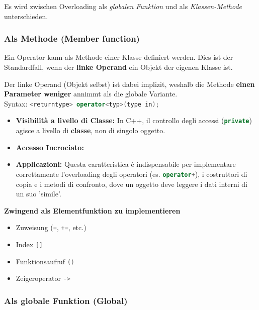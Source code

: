 Es wird zwischen Overloading als \textit{globalen Funktion} und als \textit{Klassen-Methode} unterschieden.

\subsubsection{Als Methode (Member function)}

Ein Operator kann als Methode einer Klasse definiert werden. Dies ist der Standardfall, wenn der \textbf{linke Operand} ein Objekt der eigenen Klasse ist.

Der linke Operand (Objekt selbst) ist dabei implizit, weshalb die Methode \textbf{einen Parameter weniger} annimmt als die globale Variante.\\
Syntax: \lstinline[language=C++]|<returntype> operator<typ>(type in);|

\begin{itemize}
    \item \textbf{Visibilità a livello di Classe:} In C++, il controllo degli accessi (\lstinline[language=C++]|private|) agisce a livello di \textbf{classe}, non di singolo oggetto.
    \item \textbf{Accesso Incrociato:} 
    \item \textbf{Applicazioni:} Questa caratteristica è indispensabile per implementare correttamente l'overloading degli operatori (es. \lstinline[language=C++]|operator+|), i costruttori di copia e i metodi di confronto, dove un oggetto deve leggere i dati interni di un suo 'simile'.
\end{itemize}



\textbf{Zwingend als Elementfunktion zu implementieren}
\begin{itemize}
    \item Zuweisung (\lstinline[language=C++]|=|, \lstinline[language=C++]|+=|, etc.)
    \item Index \lstinline[language=C++]|[]|
    \item Funktionsaufruf \lstinline[language=C++]|()|
    \item Zeigeroperator \lstinline[language=C++]|->|
\end{itemize}

\subsubsection{Als globale Funktion (Global)}

